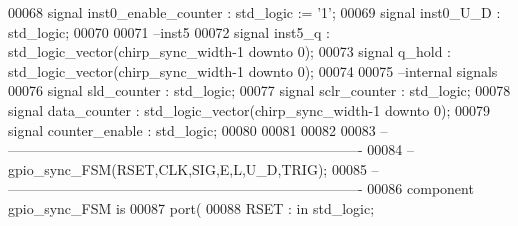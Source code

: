 \begin{DoxyCode}
00068 \textcolor{keywordflow}{signal} \textcolor{vhdlchar}{inst0_enable_counter} \textcolor{vhdlchar}{:} \textcolor{comment}{std\_logic} \textcolor{vhdlchar}{:=} \textcolor{vhdlchar}{'}\textcolor{vhdllogic}{}\textcolor{vhdllogic}{1}\textcolor{vhdlchar}{'};
00069 \textcolor{keywordflow}{signal} \textcolor{vhdlchar}{inst0_U_D}                    \textcolor{vhdlchar}{:} \textcolor{comment}{std\_logic};
00070 
00071 \textcolor{keyword}{--inst5}
00072 \textcolor{keywordflow}{signal} \textcolor{vhdlchar}{inst5_q}                \textcolor{vhdlchar}{:} \textcolor{comment}{std\_logic\_vector}\textcolor{vhdlchar}{(}\textcolor{vhdlchar}{chirp_sync_width}\textcolor{vhdlchar}{-}\textcolor{vhdllogic}{}\textcolor{vhdllogic}{1} \textcolor{keywordflow}{downto} \textcolor{vhdllogic}{}\textcolor{vhdllogic}{0}\textcolor{vhdlchar}{)};
00073 \textcolor{keywordflow}{signal} \textcolor{vhdlchar}{q_hold}                   \textcolor{vhdlchar}{:} \textcolor{comment}{std\_logic\_vector}\textcolor{vhdlchar}{(}\textcolor{vhdlchar}{chirp_sync_width}\textcolor{vhdlchar}{-}\textcolor{vhdllogic}{}\textcolor{vhdllogic}{1} \textcolor{keywordflow}{downto} \textcolor{vhdllogic}{}\textcolor{vhdllogic}{0}\textcolor{vhdlchar}{)};
00074 
00075 \textcolor{keyword}{--internal signals}
00076 \textcolor{keywordflow}{signal} \textcolor{vhdlchar}{sld_counter}              \textcolor{vhdlchar}{:} \textcolor{comment}{std\_logic};
00077 \textcolor{keywordflow}{signal} \textcolor{vhdlchar}{sclr_counter}             \textcolor{vhdlchar}{:} \textcolor{comment}{std\_logic};
00078 \textcolor{keywordflow}{signal} \textcolor{vhdlchar}{data_counter}         \textcolor{vhdlchar}{:} \textcolor{comment}{std\_logic\_vector}\textcolor{vhdlchar}{(}\textcolor{vhdlchar}{chirp_sync_width}\textcolor{vhdlchar}{-}\textcolor{vhdllogic}{}\textcolor{vhdllogic}{1} \textcolor{keywordflow}{downto} \textcolor{vhdllogic}{}\textcolor{vhdllogic}{0}\textcolor{vhdlchar}{)};
00079 \textcolor{keywordflow}{signal} \textcolor{vhdlchar}{counter_enable}           \textcolor{vhdlchar}{:} \textcolor{comment}{std\_logic};    
00080 
00081 
00082 
00083 \textcolor{keyword}{-- ----------------------------------------------------------------------------       }
00084 \textcolor{keyword}{-- gpio\_sync\_FSM(RSET,CLK,SIG,E,L,U\_D,TRIG);}
00085 \textcolor{keyword}{-- ----------------------------------------------------------------------------}
00086 \textcolor{keywordflow}{component} gpio\_sync\_FSM \textcolor{keywordflow}{is}
00087     \textcolor{keywordflow}{port}(
00088         RSET        : \textcolor{keywordflow}{in} \textcolor{comment}{std\_logic};

\end{DoxyCode}
